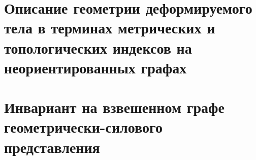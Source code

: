 \section{Описание геометрии деформируемого тела в терминах метрических и топологических индексов на неориентированных графах}\label{sec:ch1/sec1}




\section{Инвариант на взвешенном графе геометрически-силового представления}\label{sec:ch1/sec2}



\FloatBarrier
